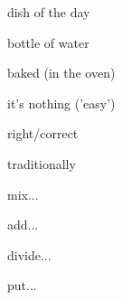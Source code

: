 \documentclass[avery5371,grid,frame]{flashcards}
\begin{document}
\begin{flashcard}{\LARGE dish of the day}
\LARGE {}
\end{flashcard}
\begin{flashcard}{\LARGE bottle of water}
\LARGE {}
\end{flashcard}
\begin{flashcard}{\LARGE baked (in the oven)}
\LARGE {}
\end{flashcard}
\begin{flashcard}{\LARGE it's nothing ('easy')}
\LARGE {}
\end{flashcard}
\begin{flashcard}{\LARGE right/correct}
\LARGE {}
\end{flashcard}
\begin{flashcard}{\LARGE traditionally}
\LARGE {}
\end{flashcard}
\begin{flashcard}{\LARGE mix...}
\LARGE {}
\end{flashcard}
\begin{flashcard}{\LARGE add...}
\LARGE {}
\end{flashcard}
\begin{flashcard}{\LARGE divide...}
\LARGE {}
\end{flashcard}
\begin{flashcard}{\LARGE put...}
\LARGE {}
\end{flashcard}
\end{document}
